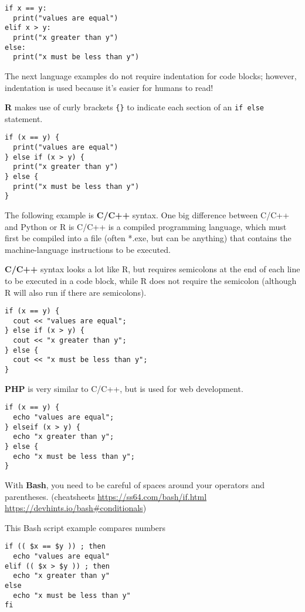 \documentclass[
]{book}
\begin{document}
\begin{verbatim}
if x == y:
  print("values are equal")
elif x > y:
  print("x greater than y")
else:
  print("x must be less than y")
\end{verbatim}

The next language examples do not require indentation for code blocks; however, indentation is used because it's easier for humans to read!

\textbf{R} makes use of curly brackets \texttt{\{\}} to indicate each section of an \texttt{if\ else} statement.

\begin{verbatim}
if (x == y) {
  print("values are equal")
} else if (x > y) {
  print("x greater than y")
} else {
  print("x must be less than y")
}
\end{verbatim}

The following example is \textbf{C/C++} syntax. One big difference between C/C++ and Python or R is C/C++ is a compiled programming language, which must first be compiled into a file (often *.exe, but can be anything) that contains the machine-language instructions to be executed.

\textbf{C/C++} syntax looks a lot like R, but requires semicolons at the end of each line to be executed in a code block, while R does not require the semicolon (although R will also run if there are semicolons).

\begin{verbatim}
if (x == y) {
  cout << "values are equal";
} else if (x > y) {
  cout << "x greater than y";
} else {
  cout << "x must be less than y";
}
\end{verbatim}

\textbf{PHP} is very similar to C/C++, but is used for web development.

\begin{verbatim}
if (x == y) {
  echo "values are equal";
} elseif (x > y) {
  echo "x greater than y";
} else {
  echo "x must be less than y";
}
\end{verbatim}

With \textbf{Bash}, you need to be careful of spaces around your operators and parentheses. (cheatsheets \url{https://ss64.com/bash/if.html} \url{https://devhints.io/bash\#conditionals})

This Bash script example compares numbers

\begin{verbatim}
if (( $x == $y )) ; then
  echo "values are equal"
elif (( $x > $y )) ; then
  echo "x greater than y"
else
  echo "x must be less than y"
fi
\end{verbatim}
\end{document}

